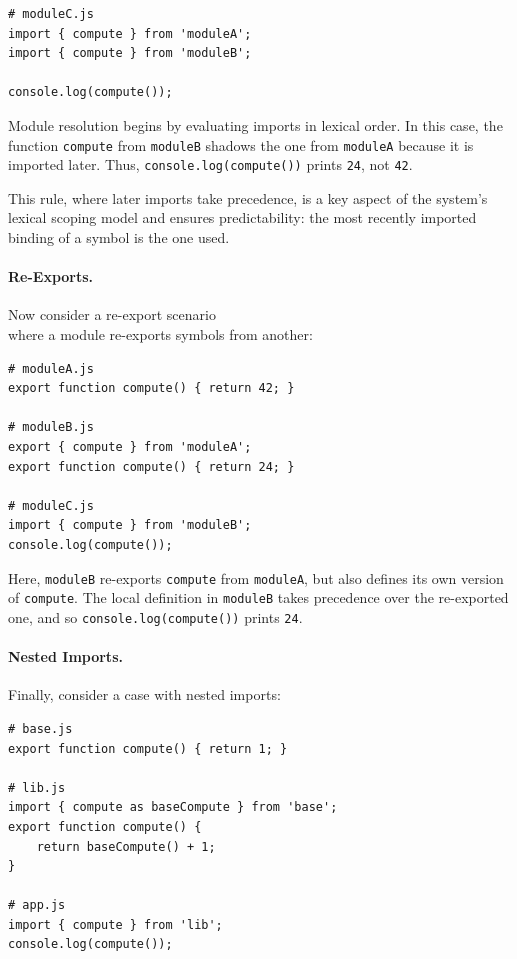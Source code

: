 \documentclass[sigplan,screen]{acmart}
\begin{document}
\begin{verbatim}
# moduleC.js
import { compute } from 'moduleA';
import { compute } from 'moduleB';

console.log(compute());
\end{verbatim}

Module resolution begins by evaluating imports in lexical order. In this case, the function \texttt{compute} from \texttt{moduleB} shadows the one from \texttt{moduleA} because it is imported later. Thus, \texttt{console.log(compute())} prints \texttt{24}, not \texttt{42}.

This rule, where later imports take precedence, is a key aspect of the system's lexical scoping model and ensures predictability: the most recently imported binding of a symbol is the one used.

\paragraph{Re-Exports.}

Now consider a re-export scenario \\where a module re-exports symbols from another:

\begin{verbatim}
# moduleA.js
export function compute() { return 42; }

# moduleB.js
export { compute } from 'moduleA';
export function compute() { return 24; }

# moduleC.js
import { compute } from 'moduleB';
console.log(compute());
\end{verbatim}

Here, \texttt{moduleB} re-exports \texttt{compute} from \texttt{moduleA}, but also defines its own version of \texttt{compute}. The local definition in \texttt{moduleB} takes precedence over the re-exported one, and so \texttt{console.log(compute())} prints \texttt{24}.

\paragraph{Nested Imports.}

Finally, consider a case with nested imports:

\begin{verbatim}
# base.js
export function compute() { return 1; }

# lib.js
import { compute as baseCompute } from 'base';
export function compute() {
    return baseCompute() + 1;
}

# app.js
import { compute } from 'lib';
console.log(compute());
\end{verbatim}
\end{document}
